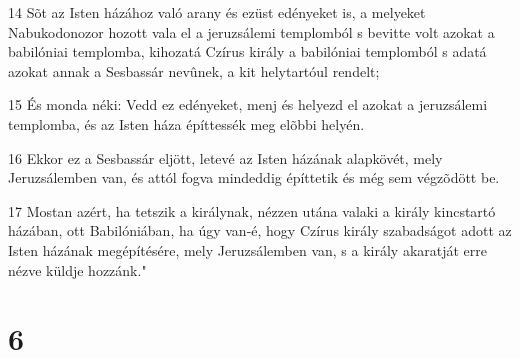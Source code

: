 \par 14 Sõt az Isten házához való arany és ezüst edényeket is, a melyeket Nabukodonozor hozott vala el a jeruzsálemi templomból s bevitte volt azokat a babilóniai templomba, kihozatá Czírus király a babilóniai templomból s adatá azokat annak a Sesbassár nevûnek, a kit helytartóul rendelt;
\par 15 És monda néki: Vedd ez edényeket, menj és helyezd el azokat a jeruzsálemi templomba, és az Isten háza építtessék meg elõbbi helyén.
\par 16 Ekkor ez a Sesbassár eljött, letevé az Isten házának alapkövét, mely Jeruzsálemben van, és attól fogva mindeddig építtetik és még sem végzõdött be.
\par 17 Mostan azért, ha tetszik a királynak, nézzen utána valaki a király kincstartó házában, ott Babilóniában, ha úgy van-é, hogy Czírus király szabadságot adott az Isten házának megépítésére, mely Jeruzsálemben van, s a király akaratját erre nézve küldje hozzánk."

\chapter{6}

